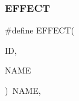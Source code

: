 \mbox{\label{_effect_8cpp_a9240be8adb787561095bcda2f39fce9b}} 
\subsubsection{E\+F\+F\+E\+CT\hspace{0.1cm}{\footnotesize\ttfamily [3/3]}}
{\footnotesize\ttfamily \#define E\+F\+F\+E\+CT(\begin{DoxyParamCaption}\item[{}]{ID,  }\item[{}]{N\+A\+ME }\end{DoxyParamCaption})~N\+A\+ME,}

